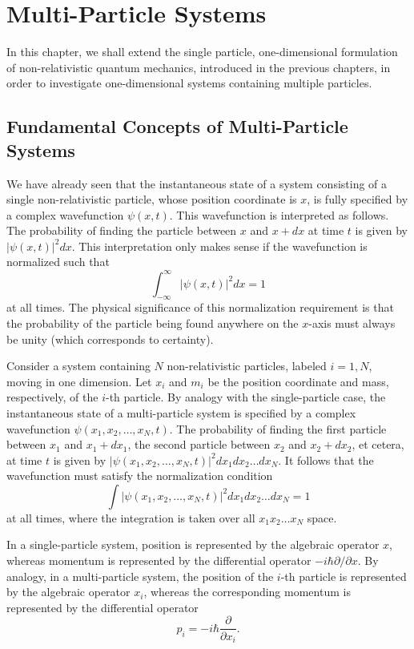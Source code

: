 \section{Multi-Particle Systems}
In this chapter, we shall extend the single particle, one-dimensional formulation of non-relativistic quantum mechanics, introduced in the previous chapters, in order to investigate one-dimensional systems containing multiple particles.
\subsection{Fundamental Concepts of Multi-Particle Systems}

We have already seen that the instantaneous state of a system consisting of a single non-relativistic particle, whose position coordinate is $x$, is fully specified by a complex wavefunction $\psi(x, t)$. This wavefunction is interpreted as follows. The probability of finding the particle between $x$ and $x+dx$ at time $t$ is given by $|\psi(x, t)|^{2} dx$. This interpretation only makes sense if the wavefunction is normalized such that
\begin{equation}
	\int_{-\infty}^{\infty}|\psi(x, t)|^2 dx = 1
\end{equation}
at all times. The physical significance of this normalization requirement is that the probability of the particle being found anywhere on the $x$-axis must always be unity (which corresponds to certainty).

Consider a system containing $N$ non-relativistic particles, labeled $i=1, N$, moving in one dimension. Let $x_{i}$ and $m_{i}$ be the position coordinate and mass, respectively, of the $i$-th particle. By analogy with the single-particle case, the instantaneous state of a multi-particle system is specified by a complex wavefunction $\psi(x_{1}, x_{2},\ldots, x_{N}, t)$. The probability of finding the first particle between $x_{1}$ and $x_{1}+dx_{1}$, the second particle between $x_{2}$ and $x_{2}+dx_{2}$, et cetera, at time $t$ is given by $|\psi(x_{1}, x_{2},\ldots, x_{N}, t)|^{2} dx_{1} dx_{2}\ldots dx_{N}$. It follows that the wavefunction must satisfy the normalization condition
\begin{equation}
	\int |\psi(x_{1}, x_{2},\ldots, x_{N}, t)|^{2} dx_{1} dx_{2}\ldots dx_{N} = 1
	\label{eq:5.1.2}
\end{equation}
at all times, where the integration is taken over all $x_{1}x_{2}\ldots x_{N}$ space.

In a single-particle system, position is represented by the algebraic operator $x$, whereas momentum is represented by the differential operator $-i\hbar\partial/\partial x$. By analogy, in a multi-particle system, the position of the $i$-th particle is represented by the algebraic operator $x_{i}$, whereas the corresponding momentum is represented by the differential operator
\begin{equation}
	p_{i} = -i\hbar\frac{\partial}{\partial x_{i}}.
	\label{eq:5.1.3}
\end{equation}

